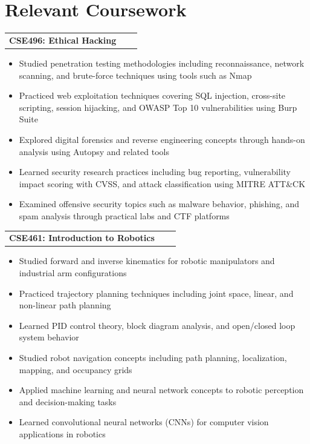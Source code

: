 \documentclass[a4paper,12pt]{article}
\makeatletter
\newenvironment{joblong}[2]
    {
    \begin{tabularx}{\linewidth}{@{}l X r@{}}
    \textbf{#1} & \hfill &  #2 \\[3.75pt]
    \end{tabularx}
    \begin{minipage}[t]{\linewidth}
    \begin{itemize}[nosep,after=\strut, leftmargin=1em, itemsep=3pt,label=--]
    }
    {
    \end{itemize}
    \end{minipage}    
    }
\makeatother
\begin{document}
\section{Relevant Coursework}


\begin{joblong}{CSE496: Ethical Hacking}{}
    \item Studied penetration testing methodologies including reconnaissance, network scanning, and brute-force techniques using tools such as Nmap
    \item Practiced web exploitation techniques covering SQL injection, cross-site scripting, session hijacking, and OWASP Top 10 vulnerabilities using Burp Suite
    \item Explored digital forensics and reverse engineering concepts through hands-on analysis using Autopsy and related tools
    \item Learned security research practices including bug reporting, vulnerability impact scoring with CVSS, and attack classification using MITRE ATT\&CK
    \item Examined offensive security topics such as malware behavior, phishing, and spam analysis through practical labs and CTF platforms
\end{joblong}

\begin{joblong}{CSE461: Introduction to Robotics}{}
    \item Studied forward and inverse kinematics for robotic manipulators and industrial arm configurations
    \item Practiced trajectory planning techniques including joint space, linear, and non-linear path planning
    \item Learned PID control theory, block diagram analysis, and open/closed loop system behavior
    \item Studied robot navigation concepts including path planning, localization, mapping, and occupancy grids
    \item Applied machine learning and neural network concepts to robotic perception and decision-making tasks
    \item Learned convolutional neural networks (CNNs) for computer vision applications in robotics
\end{joblong}
\end{document}

